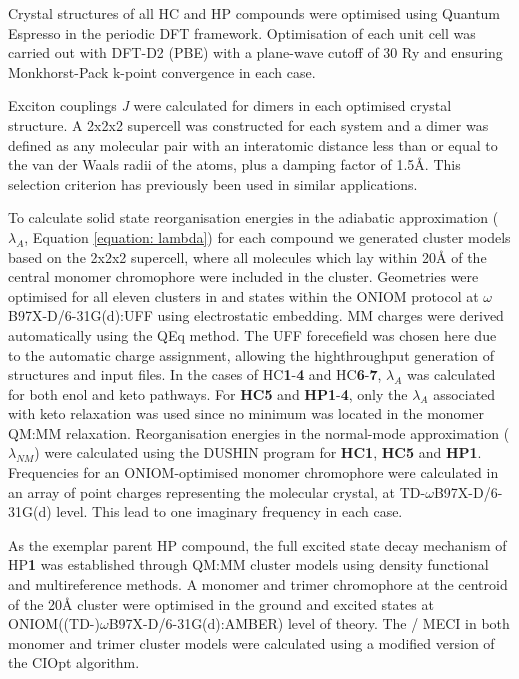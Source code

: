 Crystal structures of all \ac{HC} and \ac{HP} compounds were optimised using Quantum Espresso in the periodic DFT framework.\cite{QE-2009} Optimisation of each unit cell was carried out with DFT-D2 (PBE) with a plane-wave cutoff of 30 Ry and ensuring Monkhorst-Pack k-point convergence in each case.

Exciton couplings \textit{J} were calculated for dimers in each optimised crystal structure. A 2x2x2 supercell was constructed for each system and a dimer was defined as any molecular pair with an interatomic distance less than or equal to the van der Waals radii of the atoms, plus a damping factor of 1.5\AA. This selection criterion has previously been used in similar applications.\cite{Campbell2017} 

To calculate solid state reorganisation energies in the adiabatic approximation ($\lambda_{A}$, Equation \ref{equation: lambda}) for each compound we generated cluster models based on the 2x2x2 supercell, where all molecules which lay within 20{\AA} of the central monomer chromophore were included in the cluster. Geometries were optimised for all eleven clusters in \sone{} and \szero{} states within the ONIOM protocol at $\omega$B97X-D/6-31G(d):UFF using electrostatic embedding. MM charges were derived automatically using the QEq method.\cite{Rappe2007} The UFF forecefield was chosen here due to the automatic charge assignment, allowing the highthroughput generation of structures and input files. In the cases of \ac{HC}\textbf{1}-\textbf{4} and \ac{HC}\textbf{6}-\textbf{7}, $\lambda_{A}$ was calculated for both enol and keto pathways. For \textbf{HC5} and \textbf{HP1}-\textbf{4}, only the $\lambda_{A}$ associated with keto relaxation was used since no \Estar{} minimum was located in the monomer QM:MM relaxation. Reorganisation energies in the normal-mode approximation ($\lambda_{NM}$) were calculated using the DUSHIN program for \textbf{HC1}, \textbf{HC5} and \textbf{HP1}.\cite{Reimers2001} Frequencies for an ONIOM-optimised monomer chromophore were calculated in an array of point charges representing the molecular crystal, at TD-$\omega$B97X-D/6-31G(d) level. This lead to one imaginary frequency in each case.

As the exemplar parent \ac{HP} compound, the full excited state decay mechanism of \ac{HP}\textbf{1} was established through QM:MM cluster models using density functional and multireference methods. A monomer and trimer chromophore at the centroid of the 20{\AA} cluster were optimised in the ground and excited states at ONIOM((TD-)$\omega$B97X-D/6-31G(d):AMBER) level of theory. The \sone/\szero{} MECI in both monomer and trimer cluster models were calculated using a modified version of the CIOpt algorithm.\cite{Levine2008} 

